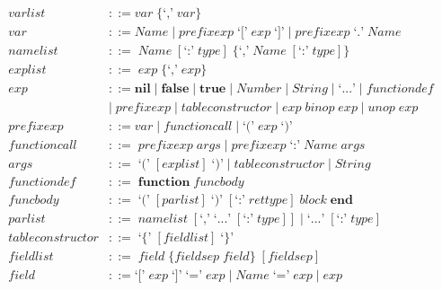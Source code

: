 \begin{align*}
\textit{varlist} & ::= \textit{var} \; \{\texttt{`,'} \; \textit{var}\}\\
\textit{var} & ::= \textit{Name} \; | \;
  \textit{prefixexp} \; \texttt{`['} \; \textit{exp} \; \texttt{`]'} \; | \;
  \textit{prefixexp} \; \texttt{`.'} \; \textit{Name}\\
\textit{namelist} & ::= \; \textit{Name} \; [\texttt{`:'} \; \textit{type}] \;
  \{\texttt{`,'} \; \textit{Name} \; [\texttt{`:'} \; \textit{type}]\}\\
\textit{explist} & ::= \; \textit{exp} \; \{\texttt{`,'} \; \textit{exp}\}\\
\textit{exp} & ::= \textbf{nil} \; | \;
  \textbf{false} \; | \;
  \textbf{true} \; | \;
  \textit{Number} \; | \;
  \textit{String} \; | \;
  \texttt{`...'} \; | \;
  \textit{functiondef}\\
& | \; \textit{prefixexp} \; | \;
  \textit{tableconstructor} \; | \;
  \textit{exp} \; \textit{binop} \; \textit{exp} \; | \;
  \textit{unop} \; \textit{exp}\\
\textit{prefixexp} & ::= \textit{var} \; | \;
  \textit{functioncall} \; | \;
  \texttt{`('} \; \textit{exp} \; \texttt{`)'}\\
\textit{functioncall} & ::= \; \textit{prefixexp} \; \textit{args} \; | \;
  \textit{prefixexp} \; \texttt{`:'} \; \textit{Name} \; \textit{args}\\
\textit{args} & ::= \; \texttt{`('} \; [\textit{explist}] \; \texttt{`)'} \; | \;
  \textit{tableconstructor} \; | \;
  \textit{String}\\
\textit{functiondef} & ::= \; \textbf{function} \; \textit{funcbody}\\
\textit{funcbody} & ::= \; \texttt{`('} \; [\textit{parlist}] \; \texttt{`)'} \; [\texttt{`:'} \; \textit{rettype}] \;
  \textit{block} \; \textbf{end}\\
\textit{parlist} & ::= \; \textit{namelist} \; [\texttt{`,'} \; \texttt{`...'} \; [\texttt{`:'} \; \textit{type}]] \; | \;
  \texttt{`...'} \; [\texttt{`:'} \; \textit{type}]\\
\textit{tableconstructor} & ::= \; \texttt{`\{'} \; [\textit{fieldlist}] \; \texttt{`\}'}\\
\textit{fieldlist} & ::= \; \textit{field} \; \{\textit{fieldsep} \; \textit{field}\} \; [\textit{fieldsep}]\\
\textit{field} & ::= \texttt{`['} \; \textit{exp} \; \texttt{`]'} \; \texttt{`='} \; \textit{exp} \; | \;
  \textit{Name} \; \texttt{`='} \; \textit{exp} \; | \;
  \textit{exp}\\

\end{align*}

